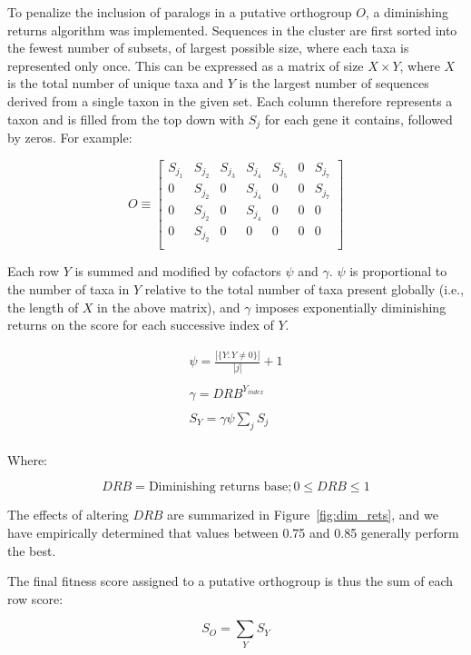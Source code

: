 \documentclass[twocolumn]{bmcart}%
\begin{document}
To penalize the inclusion of paralogs in a putative orthogroup $O$, a diminishing returns algorithm was implemented.
Sequences in the cluster are first sorted into the fewest number of subsets, of largest possible size, where each taxa is represented only once.
This can be expressed as a matrix of size $X \times Y$, where $X$ is the total number of unique taxa and $Y$ is the largest number of sequences derived from a single taxon in the given set.
Each column therefore represents a taxon and is filled from the top down with $S_j$ for each gene it contains, followed by zeros.
For example:


\[
O \equiv
\begin{bmatrix}
    S_{j_1} & S_{j_2} & S_{j_3} & S_{j_4} & S_{j_5} & 0 & S_{j_7}\\
    0 & S_{j_2} & 0 & S_{j_4} & 0 & 0 & S_{j_7} \\
    0 & S_{j_2} & 0 & S_{j_4} & 0 & 0 & 0 \\
    0 & S_{j_2} & 0 & 0 & 0 & 0 & 0 \\
\end{bmatrix}
\]

Each row $Y$ is summed and modified by cofactors $\psi$ and $\gamma$. $\psi$ is proportional to the number of taxa in $Y$ relative to the total number of taxa present globally (i.e., the length of $X$ in the above matrix), and $\gamma$ imposes exponentially diminishing returns on the score for each successive index of $Y$.

\begin{gather*}
    \psi = \frac{|\{Y:Y \neq 0\}|}{|j|} + 1\\
    \\
    \gamma = DRB^{Y_{index}}\\
    \\
    S_Y = \gamma\psi\sum_{j} S_j\\
\end{gather*}

Where:

\[
DRB = \text{Diminishing returns base}; 0 \leq DRB \leq 1
\]

The effects of altering $DRB$ are summarized in Figure~\ref{fig:dim_rets}, and we have empirically determined that values between 0.75 and 0.85 generally perform the best.

The final fitness score assigned to a putative orthogroup is thus the sum of each row score:

\[
S_O = \sum_{Y} S_Y
\]
\end{document}
